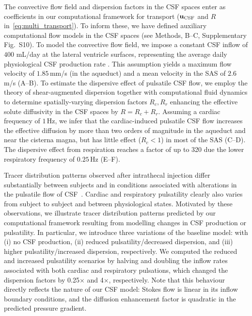 \documentclass[fleqn,10pt]{wlscirep}
\begin{document}
The convective flow field and dispersion factors in the CSF spaces
enter as coefficients in our computational framework for transport
($\mathbf{u}_{\rm CSF}$ and $R$ in~\eqref{eq:multi_transport}). To inform
these, we have defined auxiliary computational flow models in the CSF
spaces (see Methods, B--C, Supplementary Fig.~S10). 
To model the convective flow field, we impose a constant
CSF inflow of $400$ mL/day at the lateral ventricle surfaces,
representing the average daily physiological CSF production rate
\cite{lehtinen2013choroid}. This assumption yields a maximum flow
velocity of $1.85\,$mm/s (in the aqueduct) and a mean velocity in the
SAS of $2.6$ \textmu m/s (A--B). To estimate the
dispersive effect of pulsatile CSF flow, we employ the theory of
shear-augmented dispersion together with computational fluid dynamics
to determine spatially-varying dispersion factors $R_c, R_r$ enhancing
the effective solute diffusivity in the CSF spaces by $R = R_c +
R_r$. Assuming a cardiac frequency of $1\,$Hz, we infer that the
cardiac-induced pulsatile CSF flow increases the effective diffusion
by more than two orders of magnitude in the aqueduct and near the
cisterna magna, but has little effect ($R_c < 1$) in most of the SAS
(C--D). The dispersive effect from respiration
reaches a factor of up to 320 due the lower respiratory frequency of
$0.25\,$Hz (E--F).
  
Tracer distribution patterns observed after intrathecal injection
differ substantially between subjects and in conditions associated
with alterations in the pulsatile flow of CSF~\cite{ringstad2018brain,
  eide2021direction, eide2021impaired, eide2022altered}. Cardiac and
respiratory pulsatility clearly also varies from subject to subject
and between physiological states. Motivated by these observations, we
illustrate tracer distribution patterns predicted by our computational
framework resulting from modelling changes in CSF production or
pulsatility. 
%
In particular, we introduce three variations of the
baseline model: with (i) no CSF production, (ii) reduced
pulsatility/decreased dispersion, and (iii) higher
pulsatility/increased dispersion, respectively. We computed the
reduced and increased pulsatility scenarios by halving and doubling
the inflow rates associated with both cardiac and respiratory
pulsations, which changed the dispersion factors by 0.25$\times$ and
4$\times$, respectively. Note that this behaviour directly reflects
the nature of our CSF model: Stokes flow is linear in its inflow
boundary conditions, and the diffusion enhancement factor is quadratic
in the predicted pressure gradient.
\end{document}
